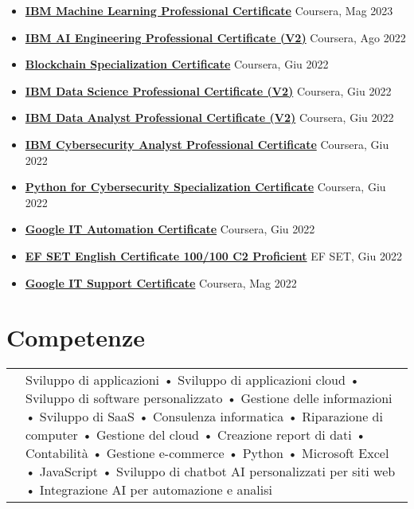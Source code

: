 \documentclass[a4paper,12pt]{article}
\begin{document}
\begin{itemize}[leftmargin=*,itemsep=3pt,parsep=0pt]
\item \textbf{\href{https://www.credly.com/badges/e562c28b-730a-444b-9776-9d1d3429b6a8/linked_in_profile}{IBM Machine Learning Professional Certificate}} \hfill \textnormal{Coursera, Mag 2023}
\item \textbf{\href{https://www.credly.com/badges/40d36ac5-31a2-4ce0-a3c0-b2ea91ff4b64/linked_in_profile}{IBM AI Engineering Professional Certificate (V2)}} \hfill \textnormal{Coursera, Ago 2022}
\item \textbf{\href{https://www.coursera.org/account/accomplishments/specialization/certificate/7RQG4Q277CA2}{Blockchain Specialization Certificate}} \hfill \textnormal{Coursera, Giu 2022}
\item \textbf{\href{https://www.credly.com/badges/41676071-2178-4f58-8db3-3622a90eecfd/linked_in_profile}{IBM Data Science Professional Certificate (V2)}} \hfill \textnormal{Coursera, Giu 2022}
\item \textbf{\href{https://www.credly.com/badges/d7986998-a9ac-4adc-8b2d-cf1edeca2301/linked_in_profile}{IBM Data Analyst Professional Certificate (V2)}} \hfill \textnormal{Coursera, Giu 2022}
\item \textbf{\href{https://www.credly.com/badges/ba500085-e96c-4704-8b80-3d2062089151/linked_in_profile}{IBM Cybersecurity Analyst Professional Certificate}} \hfill \textnormal{Coursera, Giu 2022}
\item \textbf{\href{https://www.coursera.org/account/accomplishments/specialization/certificate/3MEHP7XBU26B}{Python for Cybersecurity Specialization Certificate}} \hfill \textnormal{Coursera, Giu 2022}
\item \textbf{\href{https://www.credly.com/badges/0d6aeb02-1078-4c7b-bdd5-57cc3c2c7d8d/linked_in_profile}{Google IT Automation Certificate}} \hfill \textnormal{Coursera, Giu 2022}
\item \textbf{\href{https://www.efset.org/cert/NeK5Ry}{EF SET English Certificate 100/100 C2 Proficient}} \hfill \textnormal{EF SET, Giu 2022}
\item \textbf{\href{https://www.udemy.com/certificate/UC-250c1c0b-72ce-41ac-bdbc-da21e3e8ee85/}{Google IT Support Certificate}} \hfill \textnormal{Coursera, Mag 2022}


\end{itemize}

\section{Competenze}
\begin{tabularx}{\linewidth}{@{}l X@{}}
&  \normalsize{Sviluppo di applicazioni • Sviluppo di applicazioni cloud • Sviluppo di software personalizzato • Gestione delle informazioni • Sviluppo di SaaS • Consulenza informatica • Riparazione di computer • Gestione del cloud • Creazione report di dati • Contabilità • Gestione e-commerce • Python • Microsoft Excel • JavaScript • Sviluppo di chatbot AI personalizzati per siti web • Integrazione AI per automazione e analisi}\\
\end{tabularx}
\end{document}
